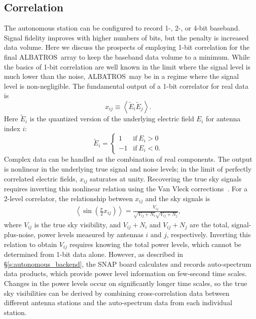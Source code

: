 \documentclass{ws-jai}
\def\albatros{ALBATROS}
\begin{document}
\subsection{Correlation}

The autonomous station can be configured to record 1-, 2-, or 4-bit
baseband.  Signal fidelity improves with higher numbers of bits, but
the penalty is increased data volume.  Here we discuss the prospects
of employing 1-bit correlation for the final \albatros\ array to keep
the baseband data volume to a minimum.  While the basics of 1-bit
correlation are well known in the limit where the signal level is much
lower than the noise, \albatros\ may be in a regime where the signal
level is non-negligible.  The fundamental output of a 1-bit correlator
for real data is
\begin{equation}
  x_{ij} \equiv \left < \tilde{E}_i \tilde{E}_j \right >.
\end{equation}
Here $\tilde{E}_i$ is the quantized version of the underlying electric
field $E_i$ for antenna index $i$:
\begin{equation}
  \tilde{E}_i=
  \begin{cases}
    1 & \text{if}\ E_i > 0 \\
    -1 & \text{if}\ E_i < 0.
  \end{cases}
\end{equation}
Complex data can be handled as the combination of real components.
The output is nonlinear in the underlying true signal and noise
levels; in the limit of perfectly correlated electric fields, $x_{ij}$
saturates at unity.  Recovering the true sky signals requires
inverting this nonlinear relation using the Van Vleck
corrections~\citep{1446497}.  For a 2-level correlator, the
relationship between $x_{ij}$ and the sky signals
is~\citep{1989ASPC....6...59D}
\begin{eqnarray}
\label{eqn:1bit_output}
\left < \sin\left(\frac{\pi}{2}x_{ij}\right)\right > = \frac{V_{ij}}{\sqrt{V_{ij}+N_i}\sqrt{V_{ij}+N_j}},
\end{eqnarray}
where $V_{ij}$ is the true sky visibility, and $V_{ij}+N_{i}$ and
$V_{ij}+N_{j}$ are the total, signal-plus-noise, power levels measured
by antennas $i$ and $j$, respectively.  Inverting this relation to
obtain $V_{ij}$ requires knowing the total power levels, which cannot
be determined from 1-bit data alone.  However, as described in
\S\ref{s:autonomous_backend}, the SNAP board calculates and records
auto-spectrum data products, which provide power level information on
few-second time scales.  Changes in the power levels occur on
significantly longer time scales, so the true sky visibilities can be
derived by combining cross-correlation data between different antenna
stations and the auto-spectrum data from each individual station.
\end{document}
